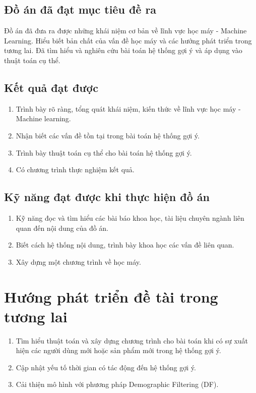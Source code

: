\subsection*{Đồ án đã đạt mục tiêu đề ra}
Đồ án đã đưa ra được những khái niệm cơ bản về lĩnh vực học máy - Machine Learning. Hiểu biết bản chất của vấn đề học máy và các hướng phát triển trong tương lai. Đã tìm hiểu và nghiên cứu bài toán hệ thống gợi ý và áp dụng vào thuật toán cụ thể.
\subsection*{Kết quả đạt được}
\begin{enumerate}
    \item Trình bày rõ ràng, tổng quát khái niệm, kiến thức về lĩnh vực học máy - Machine learning.
    \item Nhận biết các vấn đề tồn tại trong bài toán hệ thống gợi ý.
    \item Trình bày thuật toán cụ thể cho bài toán hệ thống gợi ý.
    \item Có chương trình thực nghiệm kết quả.
\end{enumerate}
\subsection*{Kỹ năng đạt được khi thực hiện đồ án}
\begin{enumerate}
    \item Kỹ năng đọc và tìm hiểu các bài báo khoa học, tài liệu chuyên ngành liên quan đến nội dung của đồ án.
    \item Biết cách hệ thống nội dung, trình bày khoa học các vấn đề liên quan.
    \item Xây dựng một chương trình về học máy.
\end{enumerate}
\section{Hướng phát triển đề tài trong tương lai}
\begin{enumerate}
    \item Tìm hiểu thuật toán và xây dựng chương trình cho bài toán khi có sự xuất hiện các người dùng mới hoặc sản phẩm mới trong hệ thống gợi ý.
    \item Cập nhật yếu tố thời gian có tác động đến hệ thống gợi ý.
    \item Cải thiện mô hình với phương pháp Demographic Filtering (DF).
\end{enumerate}

